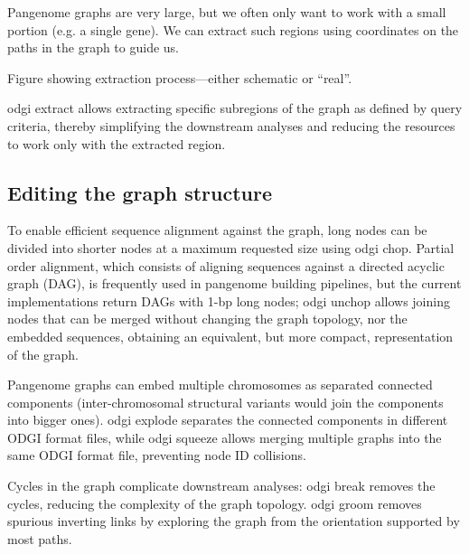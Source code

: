 \documentclass{bioinfo}
\begin{document}

Pangenome graphs are very large, but we often only want to work with a small portion (e.g. a single gene).
We can extract such regions using coordinates on the paths in the graph to guide us.

Figure showing extraction process---either schematic or ``real''.

odgi extract allows extracting specific subregions of the graph as defined by query criteria, thereby simplifying the downstream analyses and reducing the resources to work only with the extracted region.




\subsection{Editing the graph structure}
\label{sec:edit}



To enable efficient sequence alignment against the graph, long nodes can be divided into shorter nodes at a maximum requested size using odgi chop. Partial order alignment, which consists of aligning sequences against a directed acyclic graph (DAG), is frequently used in pangenome building pipelines, but the current implementations return DAGs with 1-bp long nodes; odgi unchop allows joining nodes that can be merged without changing the graph topology, nor the embedded sequences, obtaining an equivalent, but more compact, representation of the graph.

Pangenome graphs can embed multiple chromosomes as separated connected components (inter-chromosomal structural variants would join the components into bigger ones).
odgi explode separates the connected components in different ODGI format files, while odgi squeeze allows merging multiple graphs into the same ODGI format file, preventing node ID collisions.

Cycles in the graph complicate downstream analyses: odgi break removes the cycles, reducing the complexity of the graph topology.
odgi groom removes spurious inverting links by exploring the graph from the orientation supported by most paths.
\end{document}
